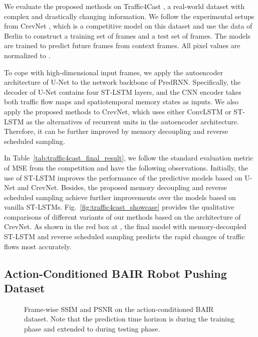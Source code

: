 \documentclass[10pt,journal,compsoc]{IEEEtran}
\newcommand{\tab}[1]{Table~\ref{#1}}
\newcommand{\fig}[1]{Fig.~\ref{#1}}
\begin{document}
We evaluate the proposed methods on Traffic4Cast \cite{Traffic4cast-web-2019}, a real-world dataset with complex and drastically changing information. 
We follow the experimental setups from CrevNet \cite{yu2020efficient}, which is a competitive model on this dataset and use the data of Berlin to construct a training set of  frames and a test set of  frames.
The models are trained to predict  future frames from  context frames. All pixel values are normalized to .


To cope with high-dimensional input frames, we apply the autoencoder architecture of U-Net \cite{ronneberger2015u} to the network backbone of PredRNN. Specifically, the decoder of U-Net contains four ST-LSTM layers, and the CNN encoder takes both traffic flow maps and spatiotemporal memory states as inputs.
We also apply the proposed methods to CrevNet, which uses either ConvLSTM or ST-LSTM as the alternatives of recurrent units in the autoencoder architecture. Therefore, it can be further improved by memory decoupling and reverse scheduled sampling.




In \tab{tab:traffic4cast_final_result}, we follow the standard evaluation metric of MSE from the competition and have the following observations.
Initially, the use of ST-LSTM improves the performance of the predictive models based on U-Net and CrevNet. 
Besides, the proposed memory decoupling and reverse scheduled sampling achieve further improvements over the models based on vanilla ST-LSTMs. 
\fig{fig:traffic4cast_showcase} provides the qualitative comparisons of different variants of our methods based on the architecture of CrevNet.  
As shown in the red box at , the final model with memory-decoupled ST-LSTM and reverse scheduled sampling predicts the rapid changes of traffic flows most accurately.

\subsection{Action-Conditioned BAIR Robot Pushing Dataset}





\begin{figure}[t]
\centering
{}
\vskip -0.1in
\caption{Frame-wise SSIM and PSNR on the action-conditioned BAIR dataset. Note that the prediction time horizon is  during the training phase and extended to  during testing phase.}
\label{fig:bair_results}
\end{figure}
\end{document}
